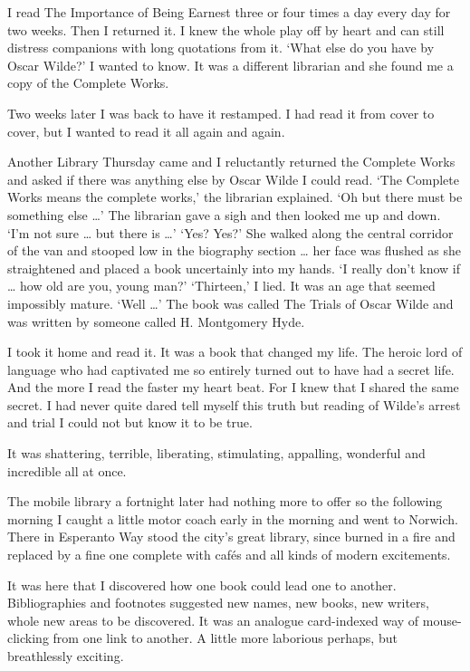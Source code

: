 \documentclass[10pt,a4paper]{article}
\begin{document}
I read The Importance of Being Earnest three or four times a day every day for two weeks. Then I returned it. I knew the whole play off by heart and can still distress companions with long quotations from it. ‘What else do you have by Oscar Wilde?’ I wanted to know. It was a different librarian and she found me a copy of the Complete Works.

Two weeks later I was back to have it restamped. I had read it from cover to cover, but I wanted to read it all again and again.

Another Library Thursday came and I reluctantly returned the Complete Works and asked if there was anything else by Oscar Wilde I could read. ‘The Complete Works means the complete works,’ the librarian explained. ‘Oh but there must be something else …’ The librarian gave a sigh and then looked me up and down. ‘I’m not sure … but there is …’ ‘Yes? Yes?’ She walked along the central corridor of the van and stooped low in the biography section … her face was flushed as she straightened and placed a book uncertainly into my hands. ‘I really don’t know if … how old are you, young man?’ ‘Thirteen,’ I lied. It was an age that seemed impossibly mature. ‘Well …’ The book was called The Trials of Oscar Wilde and was written by someone called H. Montgomery Hyde.

I took it home and read it. It was a book that changed my life. The heroic lord of language who had captivated me so entirely turned out to have had a secret life. And the more I read the faster my heart beat. For I knew that I shared the same secret. I had never quite dared tell myself this truth but reading of Wilde’s arrest and trial I could not but know it to be true.

It was shattering, terrible, liberating, stimulating, appalling, wonderful and incredible all at once.

The mobile library a fortnight later had nothing more to offer so the following morning I caught a little motor coach early in the morning and went to Norwich. There in Esperanto Way stood the city’s great library, since burned in a fire and replaced by a fine one complete with cafés and all kinds of modern excitements.

It was here that I discovered how one book could lead one to another. Bibliographies and footnotes suggested new names, new books, new writers, whole new areas to be discovered. It was an analogue card-indexed way of mouse-clicking from one link to another. A little more laborious perhaps, but breathlessly exciting.
\end{document}

